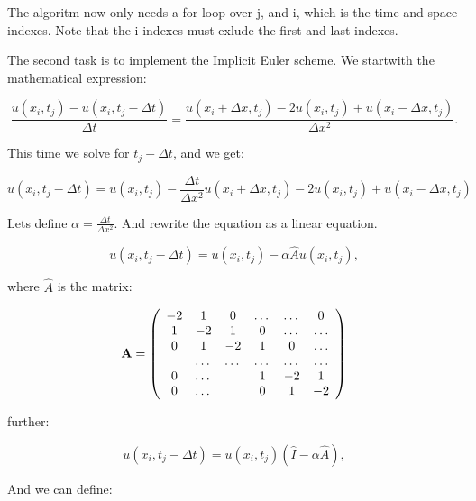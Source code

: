 \documentclass[norsk,a4paper,12pt]{article}
\begin{document}
The algoritm now only needs a for loop over j, and i, which is the time and space indexes. Note that the i indexes must exlude
the first and last indexes.

The second task is to implement the Implicit Euler scheme. We startwith the mathematical expression:

\begin{equation}
 \frac{u(x_i,t_j)-u(x_i,t_j-\Delta t)}{\Delta t} = \frac{u(x_i+\Delta x,t_j)-2u(x_i,t_j)+u(x_i-\Delta x,t_j)}{\Delta x^2}.
\end{equation}

This time we solve for $t_j - \Delta t$, and we get:

\begin{equation}
 u(x_i,t_j-\Delta t) = u(x_i,t_j) - \frac{\Delta t}{\Delta x^2} u(x_i+\Delta x,t_j)-2u(x_i,t_j)+u(x_i-\Delta x,t_j)
\end{equation}

Lets define $\alpha = \frac{\Delta t}{\Delta x^2}$. And rewrite the equation as a linear equation.

\begin{equation}
 u(x_i,t_j-\Delta t) = u(x_i,t_j) -\alpha \hat A u(x_i,t_j),
\end{equation}

where $\hat A$ is the matrix:

\begin{equation}
    {\bf A} = \left(\begin{array}{cccccc}
                           -2& 1& 0 &\dots   & \dots &0 \\
                           1 & -2 & 1 &0 &\dots &\dots \\
                           0&1 &-2 & 1 & 0 & \dots \\
                           & \dots   & \dots &\dots   &\dots & \dots \\
                           0&\dots   &  &1 &-2& 1 \\
                           0&\dots    &  & 0  &1 & -2 \\
                      \end{array} \right)
\end{equation}

further:

\begin{equation}
 u(x_i,t_j-\Delta t) = u(x_i,t_j)(\hat I -\alpha \hat A),
\end{equation}

And we can define:
\end{document}
